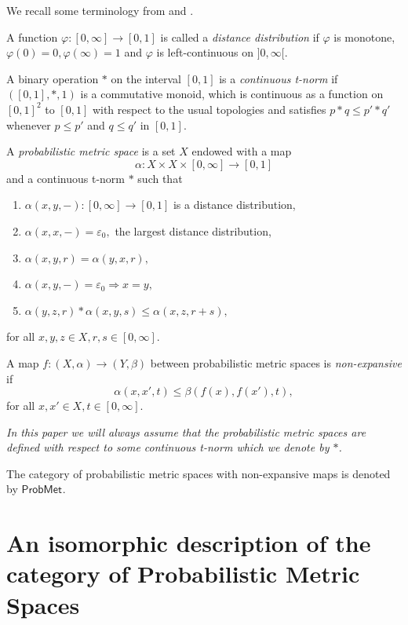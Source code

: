 \documentclass[12pt,a4paper]{amsart}
\theoremstyle{theorem}
\theoremstyle{definition}
\newcommand{\PM}{\ensuremath{\mathsf{ProbMet_{}}}}
\renewcommand{\a}{\ensuremath{\alpha}}
\renewcommand{\b}{\ensuremath{\beta}}
\newcommand{\ve}{\ensuremath{\varepsilon}}
\def\rw{\rightarrow}
\begin{document}
{We recall some terminology from \cite{SS} and \cite{LSY}. 

A function $\varphi: [0,\infty] \rw [0,1]$ is called a \emph{distance distribution} if $\varphi$ is monotone,  $\varphi(0) = 0, \varphi(\infty) =1$ and $\varphi$ is left-continuous on $]0,\infty[$.

A binary operation $*$ on the interval $[0,1]$ is a \emph{continuous t-norm} if $([0,1], *, 1)$ is a commutative monoid, which is continuous as a function on $[0,1]^2$ to $[0,1]$ with respect to the usual topologies and satisfies $p * q \leq p' * q'$ whenever $p \leq p'$ and $q \leq q'$ in $[0,1].$


A \emph{probabilistic metric space} is a set $X$ endowed with a map
\begin{equation}\label{PrMet}
\a: X \times X \times [0,\infty] \rw [0,1]
\end{equation}
and a continuous t-norm $*$ such that
\begin{enumerate}
\item [{(P1)}] $\a(x,y,-): [0,\infty] \rw [0,1] $ is a distance distribution,
\item [{(P2)}] $\a (x,x,- ) = \ve_0,$ the largest distance distribution,
\item [{(P3)}] $\a(x,y,r) = \a(y,x,r),$
\item [{(P4)}] $\a(x,y,-) = \ve_0 \Rightarrow  x = y,$
\item [{(P5)}] $\a(y,z,r) * \a(x,y,s) \leq \a(x,z,r+s),$
\end{enumerate}
for all $x,y,z \in X, r,s \in [0, \infty].$

A map $f:(X,\a) \rw (Y,\b)$ between probabilistic metric spaces is \emph{non-expansive} if 
\begin{equation}\label{nonex}
\a(x,x',t) \leq \b(f(x), f(x'),t),
\end{equation}
for all $x,x' \in X, t \in [0, \infty].$

\emph{In this paper we will always assume that the probabilistic metric spaces are defined with respect to some continuous t-norm  which we denote by $*$.}

The category of probabilistic metric spaces with non-expansive maps is denoted by $\PM.$







\section{An isomorphic description of the category of Probabilistic Metric Spaces}

}
\end{document}

